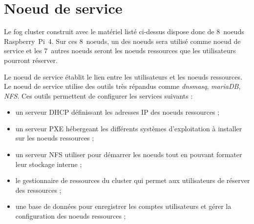 \documentclass[letterpaper, 10 pt, conference]{ieeeconf}
\begin{document}
\section{Noeud de service}
\label{sec:gestionnaire}
Le fog cluster construit avec le matériel listé ci-dessus dispose donc de 8~noeuds Raspberry~Pi~4. Sur ces 8~noeuds, un des noeuds sera utilisé comme noeud de service et les 7~autres noeuds seront les noeuds ressources que les utilisateurs pourront réserver.

Le noeud de service établit le lien entre les utilisateurs et les noeuds ressources. Le noeud de service utilise des outils très répandus comme \textit{dnsmasq}, \textit{mariaDB}, \textit{NFS}. Ces outils permettent de configurer les services suivants :
\begin{itemize}
    \item un serveur DHCP définissant les adresses IP des noeuds ressources ;
    \item un serveur PXE hébergeant les différents systèmes d'exploitation à installer sur les noeuds ressources ;
    \item un serveur NFS utiliser pour démarrer les noeuds tout en pouvant formater leur stockage interne ;
    \item le gestionnaire de ressources du cluster qui permet aux utilisateurs de réserver des ressources ;
    \item une base de données pour enregistrer les comptes utilisateurs et gérer la configuration des noeuds ressources ;
\end{itemize}
\end{document}
